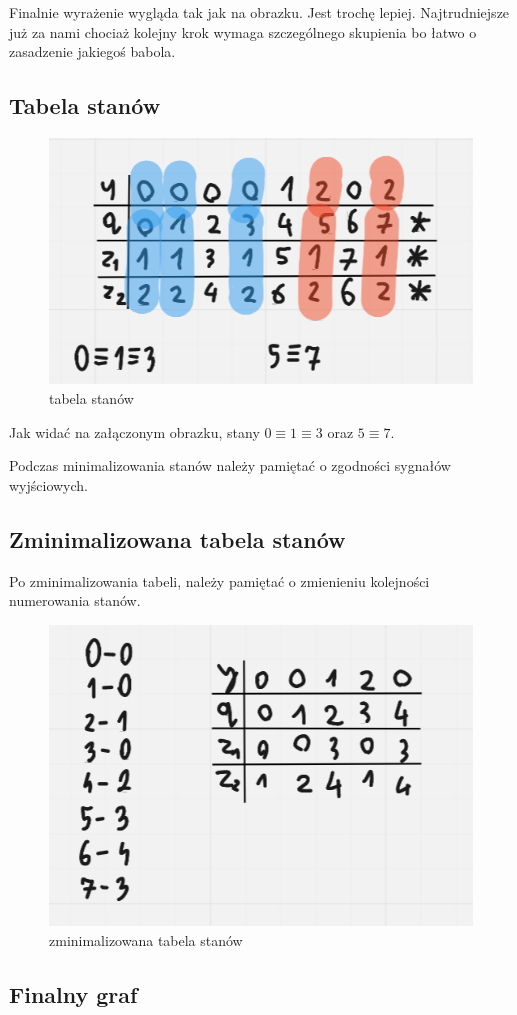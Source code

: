 Finalnie wyrażenie wygląda tak jak na obrazku. Jest trochę lepiej. Najtrudniejsze już za nami chociaż kolejny krok wymaga szczególnego skupienia bo łatwo o zasadzenie jakiegoś babola.

\subsection{Tabela stanów}

\begin{figure}[h!]
    \centering
    \includegraphics[width=.5\textwidth]{images/regex/reg_t1.png}
    \caption{tabela stanów}
    \label{fig:my_label}
\end{figure}

Jak widać na załączonym obrazku, stany $0\equiv1\equiv3$ oraz $5\equiv7$. 

Podczas minimalizowania stanów należy pamiętać o zgodności sygnałów wyjściowych. 

\newpage

\subsection{Zminimalizowana tabela stanów}

Po zminimalizowania tabeli, należy pamiętać o zmienieniu kolejności numerowania stanów.

\begin{figure}[h!]
    \centering
    \includegraphics[width=.45\textwidth]{images/regex/reg_t2.png}
    \caption{zminimalizowana tabela stanów}
    \label{fig:my_label}
\end{figure}

\subsection{Finalny graf}


